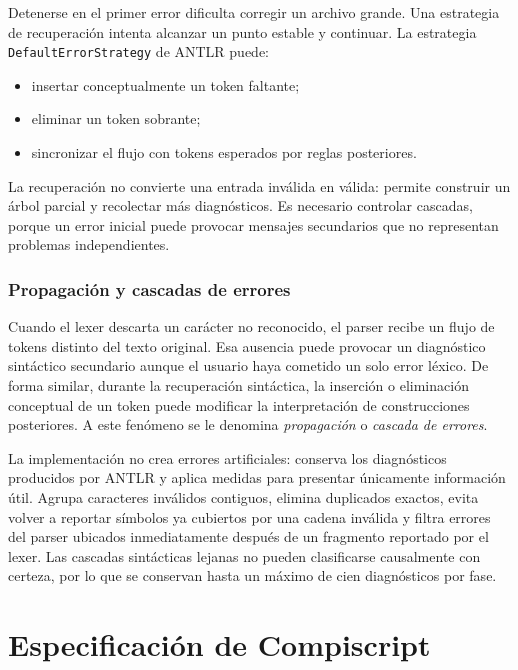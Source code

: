\documentclass[12pt,letterpaper,oneside]{report}
\newcommand{\archivo}[1]{\texttt{#1}}
\begin{document}
Detenerse en el primer error dificulta corregir un archivo grande. Una estrategia de
recuperación intenta alcanzar un punto estable y continuar. La estrategia
\archivo{DefaultErrorStrategy} de ANTLR puede:

\begin{itemize}
  \item insertar conceptualmente un token faltante;
  \item eliminar un token sobrante;
  \item sincronizar el flujo con tokens esperados por reglas posteriores.
\end{itemize}

La recuperación no convierte una entrada inválida en válida: permite construir un
árbol parcial y recolectar más diagnósticos. Es necesario controlar cascadas, porque
un error inicial puede provocar mensajes secundarios que no representan problemas
independientes.

\subsection{Propagación y cascadas de errores}

Cuando el lexer descarta un carácter no reconocido, el parser recibe un flujo de
tokens distinto del texto original. Esa ausencia puede provocar un diagnóstico
sintáctico secundario aunque el usuario haya cometido un solo error léxico. De forma
similar, durante la recuperación sintáctica, la inserción o eliminación conceptual de
un token puede modificar la interpretación de construcciones posteriores. A este
fenómeno se le denomina \emph{propagación} o \emph{cascada de errores}.

La implementación no crea errores artificiales: conserva los diagnósticos producidos
por ANTLR y aplica medidas para presentar únicamente información útil. Agrupa
caracteres inválidos contiguos, elimina duplicados exactos, evita volver a reportar
símbolos ya cubiertos por una cadena inválida y filtra errores del parser ubicados
inmediatamente después de un fragmento reportado por el lexer. Las cascadas
sintácticas lejanas no pueden clasificarse causalmente con certeza, por lo que se
conservan hasta un máximo de cien diagnósticos por fase.

\chapter{Especificación de Compiscript}
\end{document}
